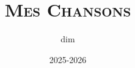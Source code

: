 \usepackage{array}
\usepackage[table]{xcolor}

\usepackage[chorded,noscripture]{songs}
\usepackage{lyluatex}

\usepackage{fontspec}
\usepackage{lilyglyphs}

\indexesoff

\renewcommand{\everychorus}{\textnote{Chorus:}}

\renewcommand{\lyricfont}{\sffamily\small}
\renewcommand{\printchord}[1]{\rmfamily\bf#1}


\title{\Huge \sffamily \scshape Mes Chansons}
\author{dim}
\date{2025-2026}
